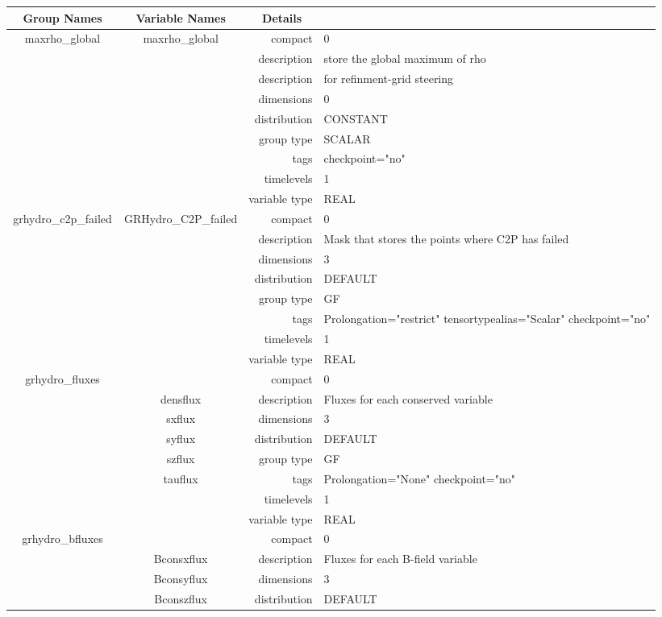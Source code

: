 \begin{tabular*}{150mm}{|c|c@{\extracolsep{\fill}}|rl|} \hline 
~ {\bf Group Names} ~ & ~ {\bf Variable Names} ~  &{\bf Details} ~ & ~ \\ 
\hline 
maxrho\_global & maxrho\_global & compact & 0 \\ 
 &  & description & store the global maximum of rho \\ 
& ~ & description &  for refinment-grid steering \\ 
 &  & dimensions & 0 \\ 
 &  & distribution & CONSTANT \\ 
 &  & group type & SCALAR \\ 
 &  & tags & checkpoint="no" \\ 
 &  & timelevels & 1 \\ 
 &  & variable type & REAL \\ 
\hline 
grhydro\_c2p\_failed & GRHydro\_C2P\_failed & compact & 0 \\ 
 &  & description & Mask that stores the points where C2P has failed \\ 
 &  & dimensions & 3 \\ 
 &  & distribution & DEFAULT \\ 
 &  & group type & GF \\ 
 &  & tags & Prolongation="restrict" tensortypealias="Scalar" checkpoint="no" \\ 
 &  & timelevels & 1 \\ 
 &  & variable type & REAL \\ 
\hline 
grhydro\_fluxes &  & compact & 0 \\ 
 & densflux & description & Fluxes for each conserved variable \\ 
 & sxflux & dimensions & 3 \\ 
 & syflux & distribution & DEFAULT \\ 
 & szflux & group type & GF \\ 
 & tauflux & tags & Prolongation="None" checkpoint="no" \\ 
 &  & timelevels & 1 \\ 
 &  & variable type & REAL \\ 
\hline 
grhydro\_bfluxes &  & compact & 0 \\ 
 & Bconsxflux & description & Fluxes for each B-field variable \\ 
 & Bconsyflux & dimensions & 3 \\ 
 & Bconszflux & distribution & DEFAULT \\ 

\end{tabular*}
